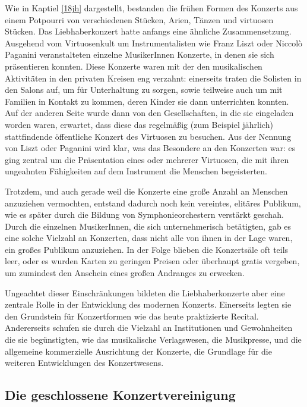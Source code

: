 \documentclass[a4paper, german, oneside]{scrbook}
\begin{document}
Wie in Kaptiel \ref{18jh} dargestellt, bestanden die frühen Formen des Konzerts aus einem Potpourri von verschiedenen Stücken, Arien, Tänzen und virtuosen Stücken. Das Liebhaberkonzert hatte anfangs eine ähnliche Zusammensetzung. Ausgehend vom Virtuosenkult um Instrumentalisten wie Franz Liszt oder Niccolò Paganini veranstalteten einzelne MusikerInnen Konzerte, in denen sie sich präsentieren konnten. Diese Konzerte waren mit der den musikalischen Aktivitäten in den privaten Kreisen eng verzahnt: einerseits traten die Solisten in den Salons auf, um für Unterhaltung zu sorgen, sowie teilweise auch um mit Familien in Kontakt zu kommen, deren Kinder sie dann unterrichten konnten. Auf der anderen Seite wurde dann von den Gesellschaften, in die sie eingeladen worden waren, erwartet, dass diese das regelmäßig (zum Beispiel jährlich) stattfindende öffentliche Konzert des Virtuosen zu besuchen. Aus der Nennung von Liszt oder Paganini wird klar, was das Besondere an den Konzerten war: es ging zentral um die Präsentation eines oder mehrerer Virtuosen, die mit ihren ungeahnten Fähigkeiten auf dem Instrument die Menschen begeisterten. \parencite[24]{weber_music_2004}

Trotzdem, und auch gerade weil die Konzerte eine große Anzahl an Menschen anzuziehen vermochten, entstand dadurch noch kein vereintes, elitäres Publikum, wie es später durch die Bildung von Symphonieorchestern verstärkt geschah. Durch die einzelnen MusikerInnen, die sich unternehmerisch betätigten, gab es eine solche Vielzahl an Konzerten, dass nicht alle von ihnen in der Lage waren, ein großes Publikum anzuziehen. In der Folge blieben die Konzertsäle oft teils leer, oder es wurden Karten zu geringen Preisen oder überhaupt gratis vergeben, um zumindest den Anschein eines großen Andranges zu erwecken. \parencite[49ff.]{weber_music_2004}

Ungeachtet dieser Einschränkungen bildeten die Liebhaberkonzerte aber eine zentrale Rolle in der Entwicklung des modernen Konzerts. Einerseits legten sie den Grundstein für Konzertformen wie das heute praktizierte Recital. Andererseits schufen sie durch die Vielzahl an Institutionen und Gewohnheiten die sie begünstigten, wie das musikalische Verlagswesen, die Musikpresse, und die allgemeine kommerzielle Ausrichtung der Konzerte, die Grundlage für die weiteren Entwicklungen des Konzertwesens.

\subsection{Die geschlossene Konzertvereinigung}
\label{konzertvereinigung}
\end{document}
